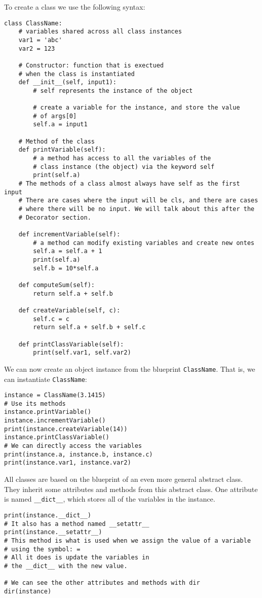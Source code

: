 \documentclass[12pt, a4paper]{article}
\begin{document}
To create a class we use the following syntax:
\lstset{language=jupyter-python,label= ,caption= ,captionpos=b,numbers=none}
\begin{lstlisting}
class ClassName:
    # variables shared across all class instances
    var1 = 'abc'
    var2 = 123

    # Constructor: function that is exectued
    # when the class is instantiated
    def __init__(self, input1):
        # self represents the instance of the object

        # create a variable for the instance, and store the value
        # of args[0]
        self.a = input1

    # Method of the class
    def printVariable(self):
        # a method has access to all the variables of the
        # class instance (the object) via the keyword self
        print(self.a)
    # The methods of a class almost always have self as the first input
    # There are cases where the input will be cls, and there are cases
    # where there will be no input. We will talk about this after the
    # Decorator section.

    def incrementVariable(self):
        # a method can modify existing variables and create new ontes
        self.a = self.a + 1
        print(self.a)
        self.b = 10*self.a

    def computeSum(self):
        return self.a + self.b

    def createVariable(self, c):
        self.c = c
        return self.a + self.b + self.c

    def printClassVariable(self):
        print(self.var1, self.var2)
\end{lstlisting}
We can now create an object instance from the blueprint \texttt{ClassName}.
That is, we can instantiate \texttt{ClassName}:
\lstset{language=jupyter-python,label= ,caption= ,captionpos=b,numbers=none}
\begin{lstlisting}
instance = ClassName(3.1415)
# Use its methods
instance.printVariable()
instance.incrementVariable()
print(instance.createVariable(14))
instance.printClassVariable()
# We can directly access the variables
print(instance.a, instance.b, instance.c)
print(instance.var1, instance.var2)
\end{lstlisting}
All classes are based on the blueprint of an even more general abstract class.
They inherit some attributes and methods from this abstract class.
One attribute is named \texttt{\_\_dict\_\_}, which stores all of the variables in the instance.
\lstset{language=jupyter-python,label= ,caption= ,captionpos=b,numbers=none}
\begin{lstlisting}
print(instance.__dict__)
# It also has a method named __setattr__
print(instance.__setattr__)
# This method is what is used when we assign the value of a variable
# using the symbol: =
# All it does is update the variables in
# the __dict__ with the new value.

# We can see the other attributes and methods with dir
dir(instance)
\end{lstlisting}
\end{document}
